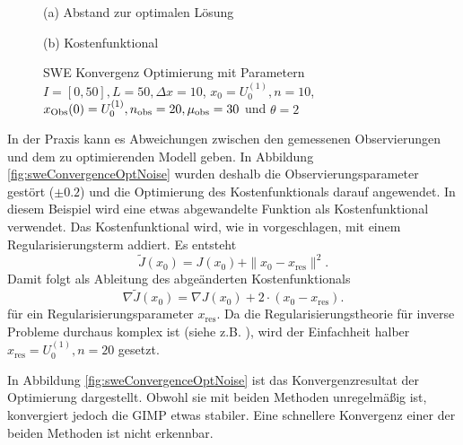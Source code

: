 \begin{figure}[H]
\centering
\begin{minipage}[b]{0.49\linewidth}
 \centering

\caption*{(a) Abstand zur optimalen Lösung}
\end{minipage}
\begin{minipage}[b]{0.49\linewidth}
 \centering

\caption*{(b) Kostenfunktional}
\end{minipage}
\caption{SWE Konvergenz Optimierung mit Parametern $I=[0,50],L=50,\Delta x=10$, $x_0=U_0^{(1)},n=10$, $x_{\text{Obs}}(0) = U_0^{(1)}, n_{\text{obs}}=20,\mu_{\text{obs}}=30$ und $\theta=2$}
\label{fig:sweConvergenceOpt}
\end{figure}


In der Praxis kann es Abweichungen zwischen den gemessenen Observierungen und dem zu optimierenden Modell geben. In Abbildung \ref{fig:sweConvergenceOptNoise} wurden deshalb die Observierungsparameter gestört ($\pm 0.2$) und die Optimierung des Kostenfunktionals darauf angewendet. 
In diesem Beispiel wird eine etwas abgewandelte Funktion als Kostenfunktional verwendet. Das Kostenfunktional wird, wie in \cite[S.2]{korotaev2008retrieving} vorgeschlagen, mit einem Regularisierungsterm addiert. Es entsteht
\[
 \tilde J(x_0) = J(x_0) + \|x_0 - x_{\text{res}}\|^2.
\]
Damit folgt als Ableitung des abgeänderten Kostenfunktionals
\[
 \nabla \tilde J(x_0) = \nabla J(x_0) + 2\cdot (x_0 - x_{\text{res}}). 
\]
 für ein Regularisierungsparameter $x_{\text{res}}$. Da die Regularisierungstheorie für inverse Probleme durchaus komplex ist (siehe z.B. \cite{engl1996regularization}), wird der Einfachheit halber $x_{\text{res}}= U_0^{(1)}, n=20$ gesetzt.

In Abbildung \ref{fig:sweConvergenceOptNoise} ist das Konvergenzresultat der Optimierung dargestellt. Obwohl sie mit beiden Methoden unregelmäßig ist, konvergiert jedoch die GIMP etwas stabiler. Eine schnellere Konvergenz einer der beiden Methoden ist nicht erkennbar.

